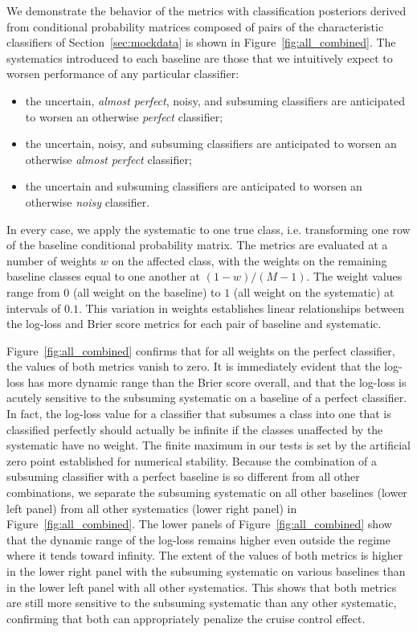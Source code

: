 We demonstrate the behavior of the metrics with classification posteriors derived from conditional probability matrices composed of pairs of the characteristic classifiers of Section~\ref{sec:mockdata} is shown in Figure~\ref{fig:all_combined}.
The systematics introduced to each baseline are those that we intuitively expect to worsen performance of any particular classifier:
\begin{itemize}
\item the uncertain, \textit{almost perfect}, noisy, and subsuming classifiers are anticipated to worsen an otherwise \textit{perfect} classifier;
\item the uncertain, noisy, and subsuming classifiers are anticipated to worsen an otherwise \textit{almost perfect} classifier;
\item the uncertain and subsuming classifiers are anticipated to worsen an otherwise \textit{noisy} classifier.
\end{itemize}
In every case, we apply the systematic to one true class, i.e. transforming one row of the baseline conditional probability matrix.
The metrics are evaluated at a number of weights $w$ on the affected class, with the weights on the remaining baseline classes equal to one another at $(1 - w) / (M - 1)$.
The weight values range from $0$ (all weight on the baseline) to $1$ (all weight on the systematic) at intervals of $0.1$.
This variation in weights establishes linear relationships between the log-loss and Brier score metrics for each pair of baseline and systematic.

Figure~\ref{fig:all_combined} confirms that for all weights on the perfect classifier, the values of both metrics vanish to zero.
It is immediately evident that the log-loss has more dynamic range than the Brier score overall, and that the log-loss is acutely sensitive to the subsuming systematic on a baseline of a perfect classifier.
In fact, the log-loss value for a classifier that subsumes a class into one that is classified perfectly should actually be infinite if the classes unaffected by the systematic have no weight.
The finite maximum in our tests is set by the artificial zero point established for numerical stability.
Because the combination of a subsuming classifier with a perfect baseline is so different from all other combinations, we separate the subsuming systematic on all other baselines (lower left panel) from all other systematics (lower right panel) in Figure~\ref{fig:all_combined}.
The lower panels of Figure~\ref{fig:all_combined} show that the dynamic range of the log-loss remains higher even outside the regime where it tends toward infinity.
The extent of the values of both metrics is higher in the lower right panel with the subsuming systematic on various baselines than in the lower left panel with all other systematics.
This shows that both metrics are still more sensitive to the subsuming systematic than any other systematic, confirming that both can appropriately penalize the cruise control effect.

